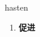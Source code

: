 
\begin{frame}
{\huge hasten}
\begin{center}
\begin{enumerate}\Large
  \item \textbf{促进}
\end{enumerate}
\end{center}
\end{frame}
